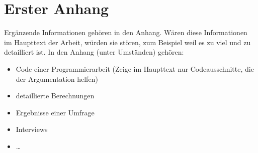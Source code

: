 
\section{Erster Anhang}

Ergänzende Informationen gehören in den Anhang. Wären diese Informationen im Haupttext der Arbeit, würden sie stören, zum Beispiel weil es zu viel und zu detailliert ist. In den Anhang (unter Umständen) gehören:
\begin{itemize}
	\item Code einer Programmierarbeit (Zeige im Haupttext nur Codeausschnitte, die der Argumentation helfen)
	\item detaillierte Berechnungen
	\item Ergebnisse einer Umfrage      
	\item Interviews
	\item \ldots
\end{itemize}

